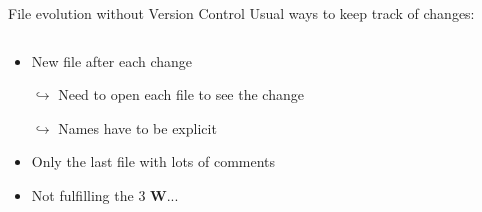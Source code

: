 \documentclass[xcolor=x11names,compress, aspectratio=169]{beamer}
\renewcommand{\(}{\begin{columns}}
\renewcommand{\)}{\end{columns}}
\newcommand{\<}[1]{\begin{column}{#1}}
\renewcommand{\>}{\end{column}}
\begin{document}
\begin{frame}{File evolution  \textcolor{brique}{without Version Control}  }
Usual ways to keep track of changes:
\pause
\begin{columns}[t]
\begin{column}{0.6\textwidth}
\begin{itemize}[<+->]
        \item New file after each change
        \item[$\hookrightarrow$] Need to open each file to see the change
        \item[$\hookrightarrow$] Names have to be explicit
        \item Only the last file with lots of comments
        \item Not fulfilling the 3 \textcolor{siap}{\textbf{W}}...


\end{itemize}
\end{column}
\end{columns}
\end{frame}
\end{document}
